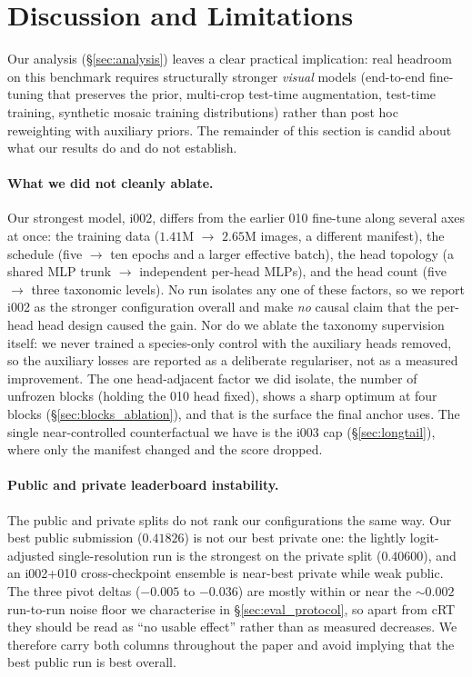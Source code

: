 \section{Discussion and Limitations}
\label{sec:discussion}

Our analysis (\S\ref{sec:analysis}) leaves a clear practical implication: real headroom on this
benchmark requires structurally stronger \emph{visual} models (end-to-end fine-tuning that
preserves the prior, multi-crop test-time augmentation, test-time training, synthetic mosaic
training distributions) rather than post hoc reweighting with auxiliary priors. The remainder of
this section is candid about what our results do and do not establish.

\paragraph{What we did not cleanly ablate.} Our strongest model, i002, differs from the earlier
010 fine-tune along several axes at once: the training data ($1.41$M $\to$ $2.65$M images, a
different manifest), the schedule (five $\to$ ten epochs and a larger effective batch), the head
topology (a shared MLP trunk $\to$ independent per-head MLPs), and the head count (five $\to$
three taxonomic levels). No run isolates any one of these factors, so we report i002 as the
stronger configuration overall and make \emph{no} causal claim that the per-head head design
caused the gain. Nor do we ablate the taxonomy supervision itself: we never trained a
species-only control with the auxiliary heads removed, so the auxiliary losses are reported as a
deliberate regulariser, not as a measured improvement. The one head-adjacent factor we did
isolate, the number of unfrozen blocks (holding the 010 head fixed), shows a sharp optimum at
four blocks (\S\ref{sec:blocks_ablation}), and that is the surface the final anchor uses. The
single near-controlled counterfactual we have is the i003 cap (\S\ref{sec:longtail}), where only
the manifest changed and the score dropped.

\paragraph{Public and private leaderboard instability.} The public and private splits do not rank
our configurations the same way. Our best public submission ($0.41826$) is not our best private
one: the lightly logit-adjusted single-resolution run is the strongest on the private split
($0.40600$), and an i002+010 cross-checkpoint ensemble is near-best private while weak public.
The three pivot deltas ($-0.005$ to $-0.036$) are mostly within or near the ${\sim}0.002$
run-to-run noise floor we characterise in \S\ref{sec:eval_protocol}, so apart from cRT they should
be read as ``no usable effect'' rather than as measured decreases. We therefore carry both
columns throughout the paper and avoid implying that the best public run is best overall.

